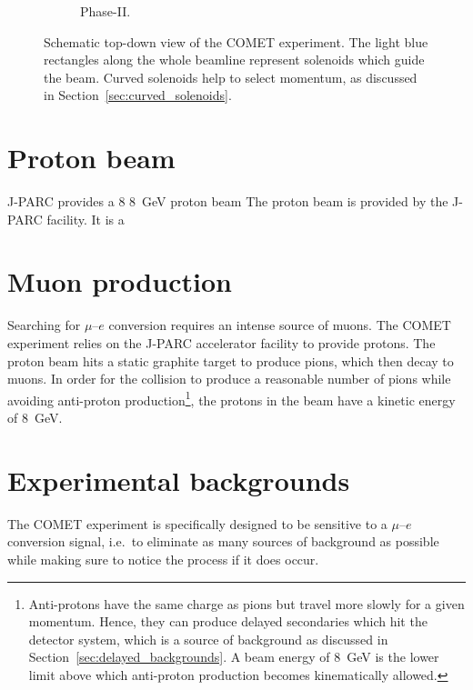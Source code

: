 \begin{figure}
\begin{subfigure}[b]{0.49\textwidth}
        \caption{Phase-II.}
    \end{subfigure}
    \caption{ Schematic top-down view of the COMET experiment. The light blue
        rectangles along the whole beamline represent solenoids which guide the
        beam. Curved solenoids help to select momentum, as discussed in
        Section~\ref{sec:curved_solenoids}.}
    \label{fig:comet_schematic}
\end{figure}


\section{Proton beam}\label{sec:COMET_beam}
J-PARC provides a 8 \SI{8}{\GeV} proton beam 
The proton beam is provided by the J-PARC facility. It is a 

\section{Muon production}
Searching for $\mu$--$e$ conversion requires an intense source of muons. The
COMET experiment relies on the J-PARC accelerator facility to provide protons.
The proton beam hits a static graphite target to produce pions, which then decay
to muons. In order for the collision to produce a reasonable number of pions
while avoiding anti-proton production\footnote{
Anti-protons have the same charge as pions but travel more slowly for a given
momentum. Hence, they can produce delayed secondaries which hit the detector
system, which is a source of background as discussed in
Section~\ref{sec:delayed_backgrounds}. A beam energy of \SI{8}{\GeV} is the
lower limit above which anti-proton production becomes kinematically allowed.
}, the protons in the beam have a kinetic energy of \SI{8}{\GeV}. 


\section{Experimental backgrounds}\label{sec:backgrounds}
The COMET experiment is specifically designed to be sensitive to a $\mu$--$e$
conversion signal, i.e.\ to eliminate as many sources of background as possible
while making sure to notice the process if it does occur. 

